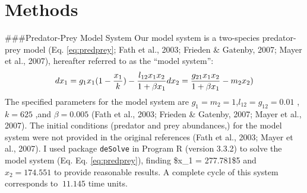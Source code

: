 \documentclass[12pt,twoside,openany]{reedthesis}
\begin{document}
\hypertarget{methods}{%
\section{Methods}\label{methods}}

\#\#\#Predator-Prey Model System
Our model system is a two-species predator-prey model (Eq. \eqref{eq:predprey}; Fath et al., 2003; Frieden \& Gatenby, 2007; Mayer et al., 2007), hereafter referred to as the ``model system'':
\begin{equation} 
  dx_1 = g_{1}x_{1}(1-\frac{x_1}{k})- \frac{l_{12} x_{1} x_{2}}{1+\beta x_{1}} \\
  dx_2 = \frac{g_{21}x_1 x_2}{1+\beta x_1} - m_2 x_2)
  \label{eq:predprey}
\end{equation}
The specified parameters for the model system are \(g_1=m_2=1\),\(l_{12}=g_{12}= 0.01\) ,\(k=625\) ,and \(\beta=0.005\) (Fath et al., 2003; Frieden \& Gatenby, 2007; Mayer et al., 2007). The initial conditions (predator and prey abundances,) for the model system were not provided in the original references (Fath et al., 2003; Mayer et al., 2007). I used package \texttt{deSolve} in Program R (version 3.3.2) to solve the model system (Eq. Eq. \eqref{eq:predprey}), finding \$x\_1 = 277.781\$5 and \(x_2= 174.551\) to provide reasonable results. A complete cycle of this system corresponds to \(~11.145\) time units.
\end{document}
